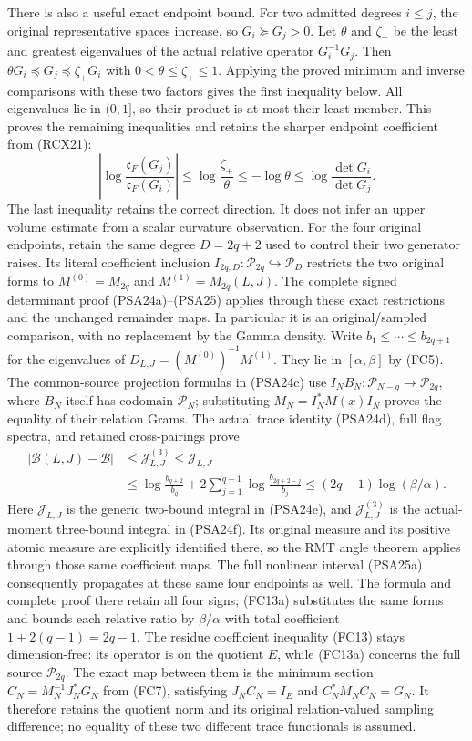 There is also a useful exact endpoint bound. For two admitted degrees
$i\le j$, the original representative spaces increase, so $G_i\succeq
G_j>0$. Let $\theta$ and $\zeta_+$ be the least and greatest
eigenvalues of the actual relative operator $G_i^{-1}G_j$.
Then $\theta G_i\preceq G_j\preceq\zeta_+G_i$ with
$0<\theta\le\zeta_+\le1$. Applying the proved minimum and inverse
comparisons with these two factors gives the first inequality below.
All eigenvalues lie in $(0,1]$, so their product is at most their
least member. This proves the remaining inequalities and retains
the sharper endpoint coefficient from (RCX21):
\[
 \left|\log\frac{\mathfrak c_F(G_j)}{\mathfrak c_F(G_i)}\right|
 \le\log\frac{\zeta_+}{\theta}
 \le-\log\theta\le\log\frac{\det G_i}{\det G_j}.
 \tag{FC13}
\]
The last inequality retains the correct direction. It does not infer
an upper volume estimate from a scalar curvature observation.
For the four original endpoints, retain the same degree $D=2q+2$
used to control their two generator raises. Its literal coefficient
inclusion $I_{2q,D}:\mathcal P_{2q}\hookrightarrow\mathcal P_D$
restricts the two original forms to
$M^{(0)}=M_{2q}$ and $M^{(1)}=M_{2q}(L,J)$.
The complete signed determinant proof (PSA24a)--(PSA25) applies
through these exact restrictions and the unchanged remainder maps.
In particular it is an original/sampled comparison, with no
replacement by the Gamma density. Write $b_1\le\cdots\le b_{2q+1}$
for the eigenvalues of $D_{L,J}=(M^{(0)})^{-1}M^{(1)}$.
They lie in $[\alpha,\beta]$ by (FC5). The common-source projection
formulas in (PSA24c) use $I_NB_N:\mathcal P_{N-q}\to\mathcal P_{2q}$,
where $B_N$ itself has codomain $\mathcal P_N$; substituting
$M_N=I_N^*M(x)I_N$ proves the equality of their relation Grams.
The actual trace identity (PSA24d), full flag spectra, and retained
cross-pairings prove
\[
 \begin{aligned}
 |\mathcal B(L,J)-\mathcal B|
 &\le\mathcal J^{(3)}_{L,J}\le\mathcal J_{L,J}\\
 &\le\log\frac{b_{q+2}}{b_q}
       +2\sum_{j=1}^{q-1}\log\frac{b_{2q+2-j}}{b_j}
 \le(2q-1)\log(\beta/\alpha).
 \end{aligned}
 \tag{FC13a}
\]
Here $\mathcal J_{L,J}$ is the generic two-bound integral in
(PSA24e), and $\mathcal J^{(3)}_{L,J}$ is the actual-moment
three-bound integral in (PSA24f). Its original measure and its
positive atomic measure are explicitly identified there, so the
RMT angle theorem applies through those same coefficient maps.
The full nonlinear interval (PSA25a) consequently propagates
at these same four endpoints as well. The formula and complete proof there retain
all four signs; (FC13a) substitutes the same forms and bounds
each relative ratio by $\beta/\alpha$ with total coefficient
$1+2(q-1)=2q-1$. The residue coefficient inequality (FC13) stays
dimension-free: its operator is on the quotient $E$, while
(FC13a) concerns the full source $\mathcal P_{2q}$.
The exact map between them is the minimum section
$C_N=M_N^{-1}J_N^*G_N$ from (FC7), satisfying
$J_NC_N=I_E$ and $C_N^*M_NC_N=G_N$. It therefore retains the
quotient norm and its original relation-valued sampling difference;
no equality of these two different trace functionals is assumed.

